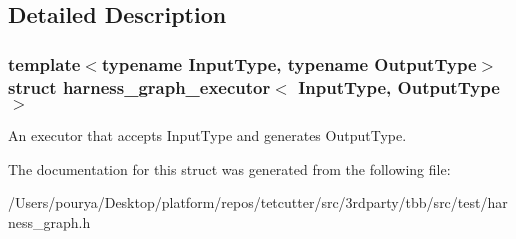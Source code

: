 \subsection{Detailed Description}
\subsubsection*{template$<$typename Input\+Type, typename Output\+Type$>$struct harness\+\_\+graph\+\_\+executor$<$ Input\+Type, Output\+Type $>$}

An executor that accepts Input\+Type and generates Output\+Type. 

The documentation for this struct was generated from the following file\+:\begin{DoxyCompactItemize}
\item 
/\+Users/pourya/\+Desktop/platform/repos/tetcutter/src/3rdparty/tbb/src/test/harness\+\_\+graph.\+h\end{DoxyCompactItemize}
